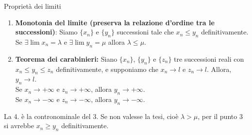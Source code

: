 \documentclass[a4paper]{article}
\begin{document}
\begin{snippetproposition}{Proprietà dei limiti}
\begin{enumerate}
        Quindi, se \(n \geq N = \max\{N_1, N_2\}\), abbiamo
        \(x_n \in (-\infty, a)\) cioè \(x_n < a\) e \(y\in (b,+\infty)\), cioè \(y_n > b\).
        Nota: perché valga la tesi, deve esserci la disuguaglianza stretta.
        Con \[x_n = \frac{{(-1)}^n}{n} \to 0\]
        Infatti, \(x_n \to 0\) se e solo se \(|x_n| \to 0\)
        \[
            \begin{cases}
                x_n \to 0 & \forall \varepsilon > 0, \exists N \suchthat \forall n \geq N, |x_n - 0| < \varepsilon \\
                |x_n| \to 0 & \forall \varepsilon > 0, \exists N \suchthat \forall n \geq N, ||x_n| - 0| < \varepsilon
            \end{cases}
        \]
        Poichè
        \[
            \left|{(-1)}^n \frac{1}{n}\right| = \frac{1}{n} \to 0
        \]
        poniamo \(y_0 = 0, \forall n\) non vale nè \(x_n \geq 0\) nè \(x_n \leq 0\) definitivamente.

        In particolare, se \(y_n \to \mu > 0\), \(y_n\) è definitivamente strettamente \(> 0\)
        cioè esiste \(N\) tale che \(\forall n \geq N, y_n > 0\) e infatti
        \(\forall b \in (0, \mu)\) esiste \(N\) tale che \(y_n > b, \forall n \geq N\).
        \item \textbf{Monotonia del limite (preserva la relazione d'ordine tra le successioni)}:
        Siamo \(\{x_n\}\) e \(\{y_n\}\) successioni tale che \(x_n \leq y_n\) definitivamente.
        Se \(\exists \lim x_n = \lambda\) e \(\exists \lim y_n = \mu\) allora \(\lambda \leq \mu\).
        \item \textbf{Teorema dei carabinieri:} Siano \(\{x_n\}\), \(\{y_n\}\) e \(\{z_n\}\)
        tre successioni reali con \(x_n \leq y_n \leq z_n\) definitivamente, e supponiamo
        che \(x_n \to l\) e \(z_n \to l\).
        Allora, \(y_n \to l\). \\
        Se \(x_n \to +\infty\) e \(z_n \to +\infty\), allora \(y_n \to +\infty\). \\
        Se \(x_n \to -\infty\) e \(z_n \to -\infty\), allora \(y_n \to -\infty\).
    \end{enumerate}
\end{snippetproposition}

La 4. è la contronominale del 3.
Se non valesse la tesi, cioè \(\lambda > \mu\), per il punto \(3\) si avrebbe
\(x_n \geq y_n\) definitivamente.
\end{document}

